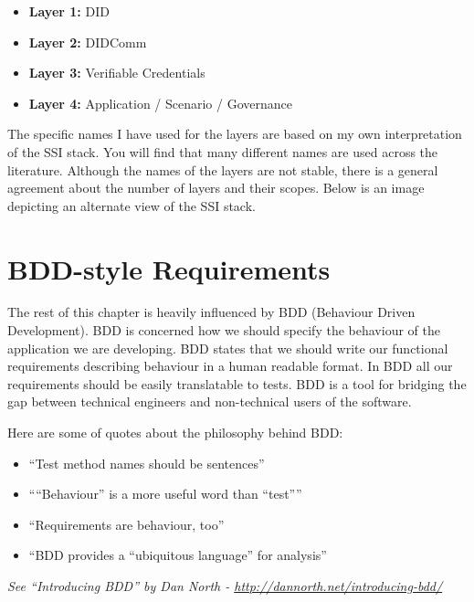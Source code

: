 \begin{itemize}
\tightlist
\item
  \textbf{Layer 1:} DID
\item
  \textbf{Layer 2:} DIDComm
\item
  \textbf{Layer 3:} Verifiable Credentials
\item
  \textbf{Layer 4:} Application / Scenario / Governance
\end{itemize}

The specific names I have used for the layers are based on my own
interpretation of the SSI stack. You will find that many different names
are used across the literature. Although the names of the layers are not
stable, there is a general agreement about the number of layers and
their scopes. Below is an image depicting an alternate view of the SSI
stack.



\hypertarget{bdd-style-requirements}{%
\section{BDD-style Requirements}\label{bdd-style-requirements}}

The rest of this chapter is heavily influenced by BDD (Behaviour Driven
Development). BDD is concerned how we should specify the behaviour of
the application we are developing. BDD states that we should write our
functional requirements describing behaviour in a human readable format.
In BDD all our requirements should be easily translatable to tests. BDD
is a tool for bridging the gap between technical engineers and
non-technical users of the software.






Here are some of quotes about the philosophy behind BDD:

\begin{itemize}
\tightlist
\item
  ``Test method names should be sentences''
\item
  ````Behaviour'' is a more useful word than ``test''''
\item
  ``Requirements are behaviour, too''
\item
  ``BDD provides a ``ubiquitous language'' for analysis''
\end{itemize}

\emph{See ``Introducing BDD'' by Dan North -
\url{http://dannorth.net/introducing-bdd/}}



